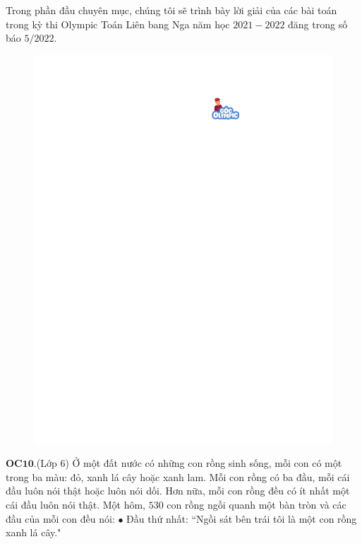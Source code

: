 \begin{multicols}{2}
	Trong phần đầu chuyên mục, chúng tôi sẽ trình bày lời giải của các bài toán trong kỳ thi Olympic Toán Liên bang Nga năm học $2021-2022$ đăng trong số báo $5/2022$. 
	\begin{figure}[H]
		\vspace*{-5pt}
		\centering
		\captionsetup{labelformat= empty, justification=centering}
		\includegraphics[width= 1\linewidth]{gocolympic}
		\vspace*{-15pt}
	\end{figure}
	{\bf\color{cackithi} OC$\pmb{10.}$}(Lớp $6$) Ở một đất nước có những con rồng sinh sống, mỗi con có một trong ba màu: đỏ, xanh lá cây hoặc xanh lam. Mỗi con rồng có ba đầu, mỗi cái đầu luôn nói thật hoặc luôn nói dối. Hơn nữa, mỗi con rồng đều có ít nhất một cái đầu luôn nói thật. 
	Một hôm, $530$ con rồng ngồi quanh một bàn tròn và các đầu của mỗi con đều nói:
	\vskip 0.1cm
	$\bullet$ Đầu thứ nhất: ``Ngồi sát bên trái tôi là một con rồng xanh lá cây."
	\vskip 0.1cm

\end{multicols}
